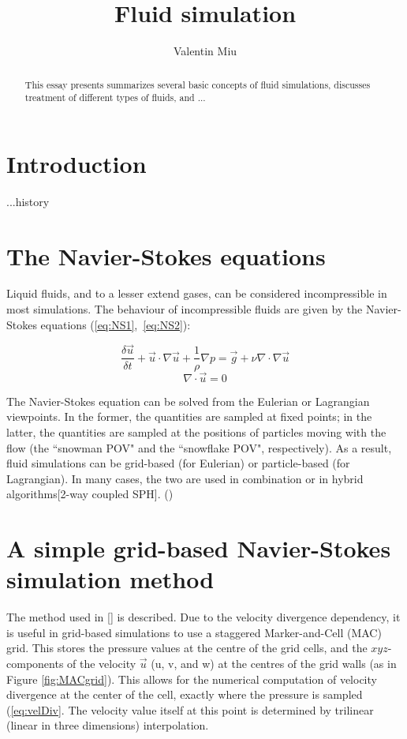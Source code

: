 \documentclass[12pt]{article}
\title{Fluid simulation}
\author{Valentin Miu}
\date{}
\begin{document}
\maketitle

\begin{abstract}
This essay presents summarizes several basic concepts of fluid simulations, discusses treatment of different types of fluids, and ...
\end{abstract}

\section{Introduction}

...history

\section{The Navier-Stokes equations}

Liquid fluids, and to a lesser extend gases, can be considered incompressible in most simulations. The behaviour of incompressible fluids are given by the Navier-Stokes equations (\ref{eq:NS1},~\ref{eq:NS2}):

\begin{equation}
\frac{\delta\vec{u}}{\delta t}+\vec{u}\cdot\nabla\vec{u}+\frac{1}{\rho}\nabla p=\vec{g}+\nu\nabla\cdot\nabla\vec{u}
\label{eq:NS1}
\end{equation}
\begin{equation}
\nabla\cdot\vec{u}=0
\label{eq:NS2}
\end{equation}


The Navier-Stokes equation can be solved from the Eulerian or Lagrangian viewpoints. In the former, the quantities are sampled at fixed points; in the latter, the quantities are sampled at the positions of particles moving with the flow (the ``snowman POV" and the ``snowflake POV", respectively). As a result, fluid simulations can be grid-based (for Eulerian) or particle-based (for Lagrangian). In many cases, the two are used in combination or in hybrid algorithms[2-way coupled SPH]. ()

\section{A simple grid-based Navier-Stokes simulation method}

The method used in [] is described. Due to the velocity divergence dependency, it is useful in grid-based simulations to use a staggered Marker-and-Cell (MAC) grid. This stores the pressure values at the centre of the grid cells, and the $xyz$-components of the velocity $\vec{u}$ (u, v, and w) at the centres of the grid walls (as in Figure \ref{fig:MACgrid}). This allows for the numerical computation of velocity divergence at the center of the cell, exactly where the pressure is sampled (\ref{eq:velDiv}. The velocity value itself at this point is determined by trilinear (linear in three dimensions) interpolation.
\end{document}
